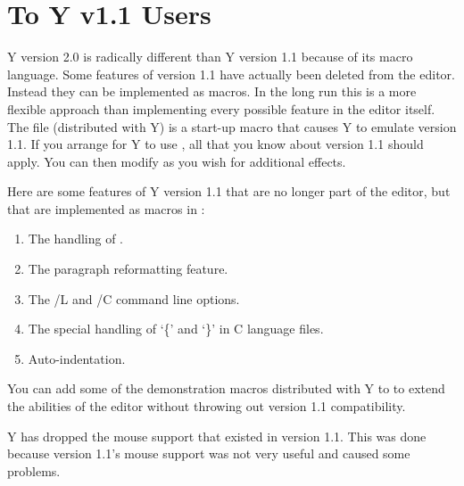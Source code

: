 \chapter{To Y v1.1 Users}

Y version 2.0 is radically different than Y version 1.1 because of its macro language. Some
features of version 1.1 have actually been deleted from the editor. Instead they can be
implemented as macros. In the long run this is a more flexible approach than implementing every
possible feature in the editor itself. The file  (distributed with Y) is a
start-up macro that causes Y to emulate version 1.1. If you arrange for Y to use
, all that you know about version 1.1 should apply. You can then modify
 as you wish for additional effects.

Here are some features of Y version 1.1 that are no longer part of the editor, but that are
implemented as macros in :

\begin{enumerate}
\item The handling of .
\item The paragraph reformatting feature.
\item The /L and /C command line options.
\item The special handling of `\{' and `\}' in C language files.
\item Auto-indentation.
\end{enumerate}

You can add some of the demonstration macros distributed with Y to  to extend
the abilities of the editor without throwing out version 1.1 compatibility.

Y has dropped the mouse support that existed in version 1.1. This was done because version 1.1's
mouse support was not very useful and caused some problems.
